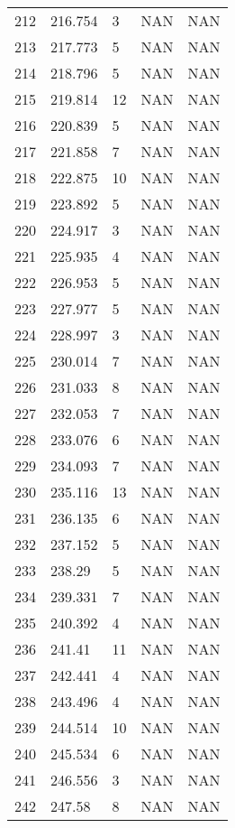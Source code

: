 \documentclass{article}
\begin{document}
\begin{longtable}{@{}lllll@{}}
				212 & 216.754 & 3     & NAN   & NAN   \\
				213 & 217.773 & 5     & NAN   & NAN   \\
				214 & 218.796 & 5     & NAN   & NAN   \\
				215 & 219.814 & 12    & NAN   & NAN   \\
				216 & 220.839 & 5     & NAN   & NAN   \\
				217 & 221.858 & 7     & NAN   & NAN   \\
				218 & 222.875 & 10    & NAN   & NAN   \\
				219 & 223.892 & 5     & NAN   & NAN   \\
				220 & 224.917 & 3     & NAN   & NAN   \\
				221 & 225.935 & 4     & NAN   & NAN   \\
				222 & 226.953 & 5     & NAN   & NAN   \\
				223 & 227.977 & 5     & NAN   & NAN   \\
				224 & 228.997 & 3     & NAN   & NAN   \\
				225 & 230.014 & 7     & NAN   & NAN   \\
				226 & 231.033 & 8     & NAN   & NAN   \\
				227 & 232.053 & 7     & NAN   & NAN   \\
				228 & 233.076 & 6     & NAN   & NAN   \\
				229 & 234.093 & 7     & NAN   & NAN   \\
				230 & 235.116 & 13    & NAN   & NAN   \\
				231 & 236.135 & 6     & NAN   & NAN   \\
				232 & 237.152 & 5     & NAN   & NAN   \\
				233 & 238.29  & 5     & NAN   & NAN   \\
				234 & 239.331 & 7     & NAN   & NAN   \\
				235 & 240.392 & 4     & NAN   & NAN   \\
				236 & 241.41  & 11    & NAN   & NAN   \\
				237 & 242.441 & 4     & NAN   & NAN   \\
				238 & 243.496 & 4     & NAN   & NAN   \\
				239 & 244.514 & 10    & NAN   & NAN   \\
				240 & 245.534 & 6     & NAN   & NAN   \\
				241 & 246.556 & 3     & NAN   & NAN   \\
				242 & 247.58  & 8     & NAN   & NAN   \\

\end{longtable}
\end{document}
